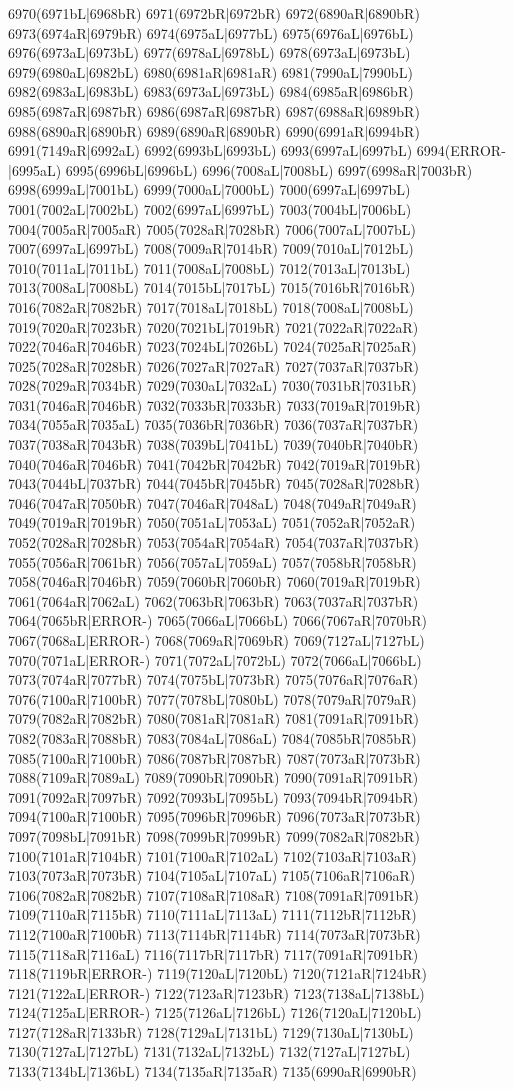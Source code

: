 6970(6971bL|6968bR) 6971(6972bR|6972bR) 6972(6890aR|6890bR) 6973(6974aR|6979bR) 6974(6975aL|6977bL) 6975(6976aL|6976bL) 6976(6973aL|6973bL) 6977(6978aL|6978bL) 6978(6973aL|6973bL) 6979(6980aL|6982bL) 6980(6981aR|6981aR) 6981(7990aL|7990bL) 6982(6983aL|6983bL) 6983(6973aL|6973bL) 6984(6985aR|6986bR) 6985(6987aR|6987bR) 6986(6987aR|6987bR) 6987(6988aR|6989bR) 6988(6890aR|6890bR) 6989(6890aR|6890bR) 6990(6991aR|6994bR) 6991(7149aR|6992aL) 6992(6993bL|6993bL) 6993(6997aL|6997bL) 6994(ERROR-|6995aL) 6995(6996bL|6996bL) 6996(7008aL|7008bL) 6997(6998aR|7003bR) 6998(6999aL|7001bL) 6999(7000aL|7000bL) 7000(6997aL|6997bL) 7001(7002aL|7002bL) 7002(6997aL|6997bL) 7003(7004bL|7006bL) 7004(7005aR|7005aR) 7005(7028aR|7028bR) 7006(7007aL|7007bL) 7007(6997aL|6997bL) 7008(7009aR|7014bR) 7009(7010aL|7012bL) 7010(7011aL|7011bL) 7011(7008aL|7008bL) 7012(7013aL|7013bL) 7013(7008aL|7008bL) 7014(7015bL|7017bL) 7015(7016bR|7016bR) 7016(7082aR|7082bR) 7017(7018aL|7018bL) 7018(7008aL|7008bL) 7019(7020aR|7023bR) 7020(7021bL|7019bR) 7021(7022aR|7022aR) 7022(7046aR|7046bR) 7023(7024bL|7026bL) 7024(7025aR|7025aR) 7025(7028aR|7028bR) 7026(7027aR|7027aR) 7027(7037aR|7037bR) 7028(7029aR|7034bR) 7029(7030aL|7032aL) 7030(7031bR|7031bR) 7031(7046aR|7046bR) 7032(7033bR|7033bR) 7033(7019aR|7019bR) 7034(7055aR|7035aL) 7035(7036bR|7036bR) 7036(7037aR|7037bR) 7037(7038aR|7043bR) 7038(7039bL|7041bL) 7039(7040bR|7040bR) 7040(7046aR|7046bR) 7041(7042bR|7042bR) 7042(7019aR|7019bR) 7043(7044bL|7037bR) 7044(7045bR|7045bR) 7045(7028aR|7028bR) 7046(7047aR|7050bR) 7047(7046aR|7048aL) 7048(7049aR|7049aR) 7049(7019aR|7019bR) 7050(7051aL|7053aL) 7051(7052aR|7052aR) 7052(7028aR|7028bR) 7053(7054aR|7054aR) 7054(7037aR|7037bR) 7055(7056aR|7061bR) 7056(7057aL|7059aL) 7057(7058bR|7058bR) 7058(7046aR|7046bR) 7059(7060bR|7060bR) 7060(7019aR|7019bR) 7061(7064aR|7062aL) 7062(7063bR|7063bR) 7063(7037aR|7037bR) 7064(7065bR|ERROR-) 7065(7066aL|7066bL) 7066(7067aR|7070bR) 7067(7068aL|ERROR-) 7068(7069aR|7069bR) 7069(7127aL|7127bL) 7070(7071aL|ERROR-) 7071(7072aL|7072bL) 7072(7066aL|7066bL) 7073(7074aR|7077bR) 7074(7075bL|7073bR) 7075(7076aR|7076aR) 7076(7100aR|7100bR) 7077(7078bL|7080bL) 7078(7079aR|7079aR) 7079(7082aR|7082bR) 7080(7081aR|7081aR) 7081(7091aR|7091bR) 7082(7083aR|7088bR) 7083(7084aL|7086aL) 7084(7085bR|7085bR) 7085(7100aR|7100bR) 7086(7087bR|7087bR) 7087(7073aR|7073bR) 7088(7109aR|7089aL) 7089(7090bR|7090bR) 7090(7091aR|7091bR) 7091(7092aR|7097bR) 7092(7093bL|7095bL) 7093(7094bR|7094bR) 7094(7100aR|7100bR) 7095(7096bR|7096bR) 7096(7073aR|7073bR) 7097(7098bL|7091bR) 7098(7099bR|7099bR) 7099(7082aR|7082bR) 7100(7101aR|7104bR) 7101(7100aR|7102aL) 7102(7103aR|7103aR) 7103(7073aR|7073bR) 7104(7105aL|7107aL) 7105(7106aR|7106aR) 7106(7082aR|7082bR) 7107(7108aR|7108aR) 7108(7091aR|7091bR) 7109(7110aR|7115bR) 7110(7111aL|7113aL) 7111(7112bR|7112bR) 7112(7100aR|7100bR) 7113(7114bR|7114bR) 7114(7073aR|7073bR) 7115(7118aR|7116aL) 7116(7117bR|7117bR) 7117(7091aR|7091bR) 7118(7119bR|ERROR-) 7119(7120aL|7120bL) 7120(7121aR|7124bR) 7121(7122aL|ERROR-) 7122(7123aR|7123bR) 7123(7138aL|7138bL) 7124(7125aL|ERROR-) 7125(7126aL|7126bL) 7126(7120aL|7120bL) 7127(7128aR|7133bR) 7128(7129aL|7131bL) 7129(7130aL|7130bL) 7130(7127aL|7127bL) 7131(7132aL|7132bL) 7132(7127aL|7127bL) 7133(7134bL|7136bL) 7134(7135aR|7135aR) 7135(6990aR|6990bR) 